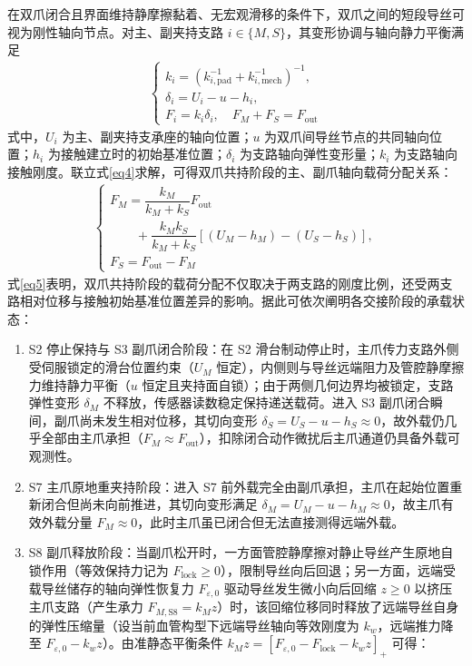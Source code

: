 \documentclass{JQRnew}
\begin{document}
在双爪闭合且界面维持静摩擦黏着、无宏观滑移的条件下，双爪之间的短段导丝可视为刚性轴向节点。对主、副夹持支路 $i \in \{ M,S\}$，其变形协调与轴向静力平衡满足
\begin{align}
	\label{eq4}
	\begin{cases}
		k_{i} = \left( k_{i,\text{pad}}^{-1} + k_{i,\text{mech}}^{-1} \right)^{-1}, \\
		\delta_{i} = U_{i} - u - h_{i}, \\
		F_{i} = k_{i}\delta_{i},\quad F_{M} + F_{S} = F_{\text{out}}
	\end{cases}
\end{align}
式中，$U_{i}$ 为主、副夹持支承座的轴向位置；$u$ 为双爪间导丝节点的共同轴向位置；$h_{i}$ 为接触建立时的初始基准位置；$\delta_{i}$ 为支路轴向弹性变形量；$k_{i}$ 为支路轴向接触刚度。联立式\eqref{eq4}求解，可得双爪共持阶段的主、副爪轴向载荷分配关系：
\begin{align}
	\label{eq5}
	\begin{cases}
		F_{M} = \dfrac{k_{M}}{k_{M} + k_{S}}F_{\text{out}} \\
		\quad\quad + \dfrac{k_{M}k_{S}}{k_{M} + k_{S}}\left[ (U_{M} - h_{M}) - (U_{S} - h_{S}) \right], \\
		F_{S} = F_{\text{out}} - F_{M}
	\end{cases}
\end{align}
式\eqref{eq5}表明，双爪共持阶段的载荷分配不仅取决于两支路的刚度比例，还受两支路相对位移与接触初始基准位置差异的影响。据此可依次阐明各交接阶段的承载状态：
\begin{enumerate}
	\item[1)] S2 停止保持与 S3 副爪闭合阶段：在 S2 滑台制动停止时，主爪传力支路外侧受伺服锁定的滑台位置约束（$U_{M}$ 恒定），内侧则与导丝远端阻力及管腔静摩擦力维持静力平衡（$u$ 恒定且夹持面自锁）；由于两侧几何边界均被锁定，支路弹性变形 $\delta_{M}$ 不释放，传感器读数稳定保持递送载荷。进入 S3 副爪闭合瞬间，副爪尚未发生相对位移，其切向变形 $\delta_{S} = U_{S} - u - h_{S} \approx 0$，故外载仍几乎全部由主爪承担（$F_{M} \approx F_{\text{out}}$），扣除闭合动作微扰后主爪通道仍具备外载可观测性。
	\item[2)] S7 主爪原地重夹持阶段：进入 S7 前外载完全由副爪承担，主爪在起始位置重新闭合但尚未向前推进，其切向变形满足 $\delta_{M} = U_{M} - u - h_{M} \approx 0$，故主爪有效外载分量 $F_{M} \approx 0$，此时主爪虽已闭合但无法直接测得远端外载。
	\item[3)] S8 副爪释放阶段：当副爪松开时，一方面管腔静摩擦对静止导丝产生原地自锁作用（等效保持力记为 $F_{\text{lock}} \ge 0$），限制导丝向后回退；另一方面，远端受载导丝储存的轴向弹性恢复力 $F_{\varepsilon,0}$ 驱动导丝发生微小向后回缩 $z \ge 0$ 以挤压主爪支路（产生承力 $F_{M,\text{S8}} = k_{M}z$）时，该回缩位移同时释放了远端导丝自身的弹性压缩量（设当前血管构型下远端导丝轴向等效刚度为 $k_{w}$，远端推力降至 $F_{\varepsilon,0} - k_{w}z$）。由准静态平衡条件 $k_{M}z = [F_{\varepsilon,0} - F_{\text{lock}} - k_{w}z]_{+}$ 可得：
\end{enumerate}
\end{document}
